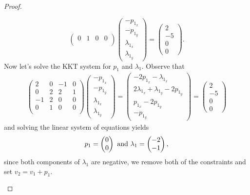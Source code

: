 \documentclass[12pt]{report}
\begin{document}
\begin{problem}
\begin{proof}
\begin{enumerate}
\begin{equation*}
\begin{pmatrix}
            0 & 1 & 0 & 0\\
        \end{pmatrix}\begin{pmatrix}
            -p_{1_x}\\-p_{1_y}\\\lambda_{1_x}\\\lambda_{1_y}
        \end{pmatrix} = \begin{pmatrix}
            2 \\ -5 \\ 0 \\ 0
        \end{pmatrix}.
    \end{equation*}
    Now let's solve the KKT system for $p_1$ and $\lambda_1$. Observe that
    \begin{align*}
        \begin{pmatrix}
            2 & 0 & -1 & 0\\
            0 & 2 & 2 & 1\\
            -1 & 2 & 0 & 0\\
            0 & 1 & 0 & 0\\
        \end{pmatrix}\begin{pmatrix}
            -p_{1_x}\\-p_{1_y}\\\lambda_{1_x}\\\lambda_{1_y}
        \end{pmatrix} = \begin{pmatrix}
            -2p_{1_x} - \lambda_{1_x}\\ 2\lambda_{1_x} + \lambda_{1_y} - 2 p_{1_y}\\ p_{1_x} - 2 p_{1_y} \\ - p_{1_y}
        \end{pmatrix} = \begin{pmatrix}
            2 \\ -5 \\ 0 \\ 0
        \end{pmatrix}
    \end{align*}
    and solving the linear system of equations yields
    \begin{equation*}
        p_1 = \begin{pmatrix}
            0 \\ 0
        \end{pmatrix} {~\text{and}~} \lambda_1 = \begin{pmatrix}
            -2 \\ -1
        \end{pmatrix},
    \end{equation*}
    since both components of $\lambda_1$ are negative, we remove both of the constraints and set $v_2 = v_1 + p_1$.


\end{enumerate}
\end{proof}
\end{problem}
\end{document}
